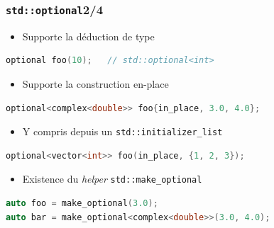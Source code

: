 \documentclass[C++.tex]{subfiles}
\begin{document}
\begin{frame}[fragile]
	\frametitle{\lstinline|std::optional|\titlehfill{}2/4}
	\begin{itemize}
		\item Supporte la déduction de type
	\end{itemize}

	\begin{lstlisting}[language=C++]
optional foo(10);	// std::optional<int>\end{lstlisting}

	\begin{itemize}
		\item Supporte la construction en-place
	\end{itemize}
		
	\begin{lstlisting}[language=C++]
optional<complex<double>> foo{in_place, 3.0, 4.0};\end{lstlisting}
		
	\begin{itemize}
		\item Y compris depuis un \lstinline|std::initializer_list|
	\end{itemize}

	\begin{lstlisting}[language=C++]
optional<vector<int>> foo(in_place, {1, 2, 3});\end{lstlisting}

	\begin{itemize}
		\item Existence du \textit{helper} \lstinline|std::make_optional|
	\end{itemize}
		
	\begin{lstlisting}[language=C++]
auto foo = make_optional(3.0);
auto bar = make_optional<complex<double>>(3.0, 4.0);\end{lstlisting}
\end{frame}
\end{document}
